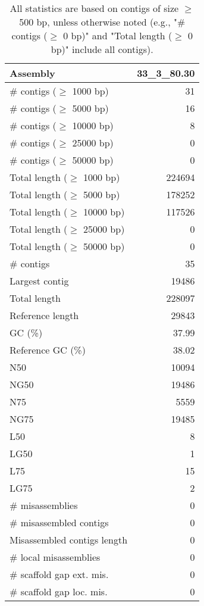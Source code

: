 \documentclass[12pt,a4paper]{article}
\begin{document}
\begin{table}[ht]
\begin{center}
\caption{All statistics are based on contigs of size $\geq$ 500 bp, unless otherwise noted (e.g., "\# contigs ($\geq$ 0 bp)" and "Total length ($\geq$ 0 bp)" include all contigs).}
\begin{tabular}{|l*{1}{|r}|}
\hline
Assembly & 33\_3\_80.30 \\ \hline
\# contigs ($\geq$ 1000 bp) & 31 \\ \hline
\# contigs ($\geq$ 5000 bp) & 16 \\ \hline
\# contigs ($\geq$ 10000 bp) & 8 \\ \hline
\# contigs ($\geq$ 25000 bp) & 0 \\ \hline
\# contigs ($\geq$ 50000 bp) & 0 \\ \hline
Total length ($\geq$ 1000 bp) & 224694 \\ \hline
Total length ($\geq$ 5000 bp) & 178252 \\ \hline
Total length ($\geq$ 10000 bp) & 117526 \\ \hline
Total length ($\geq$ 25000 bp) & 0 \\ \hline
Total length ($\geq$ 50000 bp) & 0 \\ \hline
\# contigs & 35 \\ \hline
Largest contig & 19486 \\ \hline
Total length & 228097 \\ \hline
Reference length & 29843 \\ \hline
GC (\%) & 37.99 \\ \hline
Reference GC (\%) & 38.02 \\ \hline
N50 & 10094 \\ \hline
NG50 & 19486 \\ \hline
N75 & 5559 \\ \hline
NG75 & 19485 \\ \hline
L50 & 8 \\ \hline
LG50 & 1 \\ \hline
L75 & 15 \\ \hline
LG75 & 2 \\ \hline
\# misassemblies & 0 \\ \hline
\# misassembled contigs & 0 \\ \hline
Misassembled contigs length & 0 \\ \hline
\# local misassemblies & 0 \\ \hline
\# scaffold gap ext. mis. & 0 \\ \hline
\# scaffold gap loc. mis. & 0 \\ \hline

\end{tabular}
\end{center}
\end{table}
\end{document}
